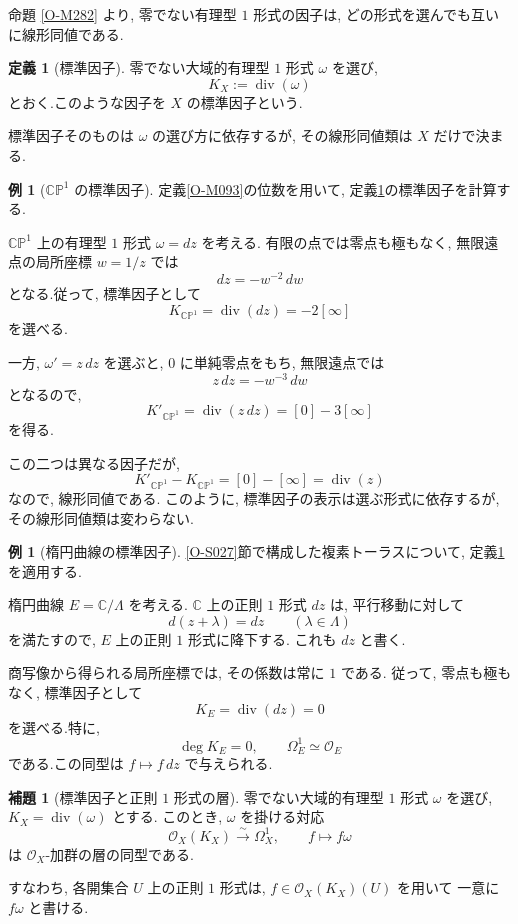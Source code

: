 \documentclass[dvipdfmx,a4paper,11pt]{article} %
\newcommand{\C}{\mathbb{C}}
\theoremstyle{definition}
\numberwithin{equation}{section}
\newtheorem{lem}[thm]{補題}
\newtheorem{dfn}[thm]{定義}
\newtheorem{exa}[thm]{例}
\begin{document}
命題 \ref{O-M282} より, 
零でない有理型 $1$ 形式の因子は, 
どの形式を選んでも互いに線形同値である.

\begin{dfn}[標準因子]\label{O-M285}
零でない大域的有理型 $1$ 形式 $\omega$ を選び, 
\[
K_X:=\operatorname{div}(\omega)
\]
とおく.このような因子を $X$ の標準因子という.
\end{dfn}
標準因子そのものは $\omega$ の選び方に依存するが, 
その線形同値類は $X$ だけで決まる.

\begin{exa}[$\C\mathbb P^1$ の標準因子]\label{exa-canonical-sphere}
定義\ref{O-M093}の位数を用いて, 定義\ref{O-M285}の標準因子を計算する.

$\C\mathbb P^1$ 上の有理型 $1$ 形式 $\omega=dz$ を考える.
有限の点では零点も極もなく, 
無限遠点の局所座標 $w=1/z$ では
\[
dz=-w^{-2}\,dw
\]
となる.従って, 標準因子として
\[
K_{\C\mathbb P^1}=\operatorname{div}(dz)=-2[\infty]
\]
を選べる.

一方, $\omega'=z\,dz$ を選ぶと, 
$0$ に単純零点をもち, 無限遠点では
\[
z\,dz=-w^{-3}\,dw
\]
となるので, 
\[
K'_{\C\mathbb P^1}
=\operatorname{div}(z\,dz)=[0]-3[\infty]
\]
を得る.

この二つは異なる因子だが, 
\[
K'_{\C\mathbb P^1}-K_{\C\mathbb P^1}
=[0]-[\infty]=\operatorname{div}(z)
\]
なので, 線形同値である.
このように, 標準因子の表示は選ぶ形式に依存するが, 
その線形同値類は変わらない.
\end{exa}

\begin{exa}[楕円曲線の標準因子]\label{exa-canonical-torus}
\ref{O-S027}節で構成した複素トーラスについて, 定義\ref{O-M285}を適用する.

楕円曲線 $E=\C/\Lambda$ を考える.
$\C$ 上の正則 $1$ 形式 $dz$ は, 平行移動に対して
\[
d(z+\lambda)=dz\qquad(\lambda\in\Lambda)
\]
を満たすので, $E$ 上の正則 $1$ 形式に降下する.
これも $dz$ と書く.

商写像から得られる局所座標では, その係数は常に $1$ である.
従って, 零点も極もなく, 標準因子として
\[
K_E=\operatorname{div}(dz)=0
\]
を選べる.特に, 
\[
\deg K_E=0,\qquad
\Omega_E^1\simeq\mathcal O_E
\]
である.この同型は $f\mapsto f\,dz$ で与えられる.
\end{exa}

\begin{lem}[標準因子と正則 $1$ 形式の層]\label{O-M286}
零でない大域的有理型 $1$ 形式 $\omega$ を選び,
$K_X=\operatorname{div}(\omega)$ とする.
このとき, $\omega$ を掛ける対応
\[
\mathcal O_X(K_X)\xrightarrow{\sim}\Omega_X^1,
\qquad f\longmapsto f\omega
\]
は $\mathcal O_X$-加群の層の同型である.

すなわち, 各開集合 $U$ 上の正則 $1$ 形式は,
$f\in\mathcal O_X(K_X)(U)$ を用いて
一意に $f\omega$ と書ける.
\end{lem}
\end{document}
